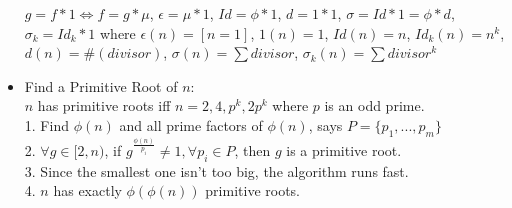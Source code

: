 \begin{itemize}
  $g=f*1\Leftrightarrow f=g*\mu$, $\epsilon=\mu*1$, $Id=\phi*1$, $d=1*1$, $\sigma=Id*1=\phi*d$,\\
  $\sigma_k=Id_k*1$ where $\epsilon(n)=[n=1]$, $1(n)=1$, $Id(n)=n$, $Id_k(n)=n^k$,\\
  $d(n)=\#(divisor)$, $\sigma(n)=\sum divisor$, $\sigma_k(n)=\sum divisor^k$
\item Find a Primitive Root of $n$:\\
  $n$ has primitive roots iff $n=2,4,p^k,2p^k$ where $p$ is an odd prime.\\
  1. Find $\phi(n)$ and all prime factors of $\phi(n)$, says $P=\{p_1,...,p_m\}$\\
  2. $\forall g\in[2,n)$, if $g^{\frac{\phi(n)}{p_i}}\ne 1,\forall p_i\in P$, then $g$ is a primitive root.\\
  3. Since the smallest one isn't too big, the algorithm runs fast.\\
  4. $n$ has exactly $\phi(\phi(n))$ primitive roots.
\end{itemize}
